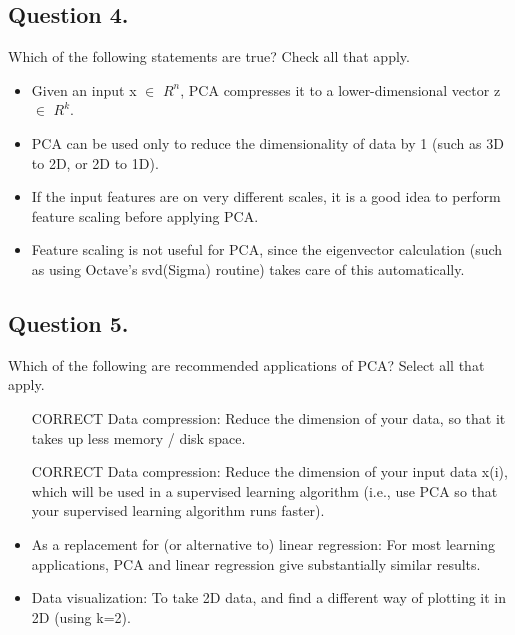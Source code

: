 \documentclass[11pt]{article} %
\begin{document}
%
%
%

\subsection{ Question 4. }
Which of the following statements are true? Check all that apply.

\begin{itemize}
	\item Given an input x $\in$ $R^n$, PCA compresses it to a lower-dimensional vector z$\in$ $R^k$.
	
	\item PCA can be used only to reduce the dimensionality of data by 1 (such as 3D to 2D, or 2D to 1D).
	
	\item If the input features are on very different scales, it is a good idea to perform feature scaling before applying PCA.
	
	\item Feature scaling is not useful for PCA, since the eigenvector calculation (such as using Octave's svd(Sigma) routine) takes care of this automatically.
\end{itemize}
\subsection{ Question 5. }
Which of the following are recommended applications of PCA? Select all that apply.

\begin{itemize}
	\item [CORRECT] Data compression: Reduce the dimension of your data, so that it takes up less memory / disk space.
	
	\item [CORRECT] Data compression: Reduce the dimension of your input data x(i), which will be used in a supervised learning algorithm (i.e., use PCA so that your supervised learning algorithm runs faster).
	
	\item As a replacement for (or alternative to) linear regression: For most learning applications, PCA and linear regression give substantially similar results.
	
	\item Data visualization: To take 2D data, and find a different way of plotting it in 2D (using k=2).
	
\end{itemize}
\newpage
\end{document}
